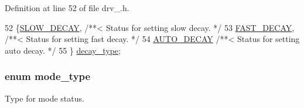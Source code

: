 Definition at line 52 of file drv\-\_.\-h.


\begin{DoxyCode}
52              \{\hyperlink{group__DRV8825_ggafe05744bd777532cf059c0d7293a7ab8a05f6a902065ce2f3355101cf657f4ba4}{SLOW\_DECAY},       \textcolor{comment}{/**< Status for setting slow decay. */}
53         \hyperlink{group__DRV8825_ggafe05744bd777532cf059c0d7293a7ab8af9716e06b54f75cbd7dedc154a7d49e2}{FAST\_DECAY},             \textcolor{comment}{/**< Status for setting fast decay. */}
54         \hyperlink{group__DRV8825_ggafe05744bd777532cf059c0d7293a7ab8abbe5a117b6da07d1a52741cfff2e927a}{AUTO\_DECAY}              \textcolor{comment}{/**< Status for setting auto decay. */}
55         \} \hyperlink{group__DRV8825_gafe05744bd777532cf059c0d7293a7ab8}{decay\_type};
\end{DoxyCode}
\hypertarget{group__DRV8825_ga19269c193c0c4866cdc4e5abd433f9fc}{
\subsubsection[{mode\-\_\-type}]{\setlength{\rightskip}{0pt plus 5cm}enum {\bf mode\-\_\-type}}}\label{group__DRV8825_ga19269c193c0c4866cdc4e5abd433f9fc}


Type for mode status. 

